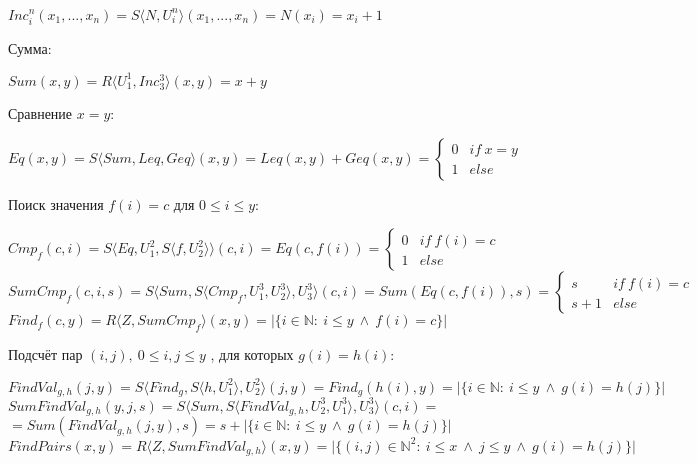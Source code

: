 \documentclass{article}
\begin{document}
\begin{spacing}{1.4}
\begin{center}
		$Inc_i^n(x_1, ..., x_n) = S\langle N, U_i^n \rangle (x_1, ..., x_n) = N(x_i) = x_i + 1$ \\
	\end{center}
	Сумма:
	\begin{center}
		$Sum(x, y) = R\langle U_1^1, Inc_3^3 \rangle (x, y) = x + y$\\
	\end{center}
	Сравнение $x = y$:
	\begin{center}
		$Eq(x, y) = S\langle Sum, Leq, Geq \rangle (x, y) = Leq(x, y) + Geq(x, y) = \begin{cases}
		0 & if \ x = y \\
		1 & else
		\end{cases}$\\
	\end{center}
	Поиск значения $f(i) = c$ для $0 \leq i \leq y$:
	\begin{center}
		$Cmp_f(c, i) = S\langle Eq, U_1^2, S \langle f, U_2^2 \rangle\rangle (c, i) =  
		Eq(c, f(i)) = 
		\begin{cases}
		0 & if \ f(i) = c \\
		1 & else
		\end{cases}$\\
		$SumCmp_f(c, i, s) = S\langle Sum, S \langle Cmp_f, U_1^3, U_2^3 \rangle, U_3^3 \rangle(c, i) =  
		Sum(Eq(c, f(i)), s) = 
		\begin{cases}
		s & if \ f(i) = c \\
		s + 1 & else
		\end{cases}$\\
		$Find_f(c, y) = R\langle Z, SumCmp_f\rangle (x, y) = \lvert\{ i \in \mathbb{N} : \ i \leq y \ \wedge  \ f(i) = c \}\rvert$
	\end{center}
	Подсчёт пар $(i, j), \ 0 \leq i, j \leq y$ , для которых $g(i) = h(i)$:
	\begin{center}
		$FindVal_{g,h}(j, y) = S\langle Find_g, S\langle h, U_1^2\rangle, U_2^2\rangle (j, y) =  
		Find_g(h(i), y) = \lvert\{ i \in \mathbb{N} : \ i \leq y \ \wedge  \ g(i) = h(j) \}\rvert$\\
		$SumFindVal_{g,h}(y, j, s) = S\langle Sum, S \langle FindVal_{g,h}, U_2^3, U_1^3 \rangle, U_3^3 \rangle(c, i) =  $\\$=
		Sum(FindVal_{g,h}(j, y), s) = s + \lvert\{ i \in \mathbb{N} : \ i \leq y \ \wedge  \ g(i) = h(j) \}\rvert$\\
		$FindPairs(x, y) = R\langle Z, SumFindVal_{g, h}\rangle (x, y) = \lvert\{ (i, j) \in \mathbb{N}^2 : \ i \leq x \ \wedge \ j \leq y \ \wedge  \ g(i) = h(j) \}\rvert$

\end{center}
\end{spacing}
\end{document}
